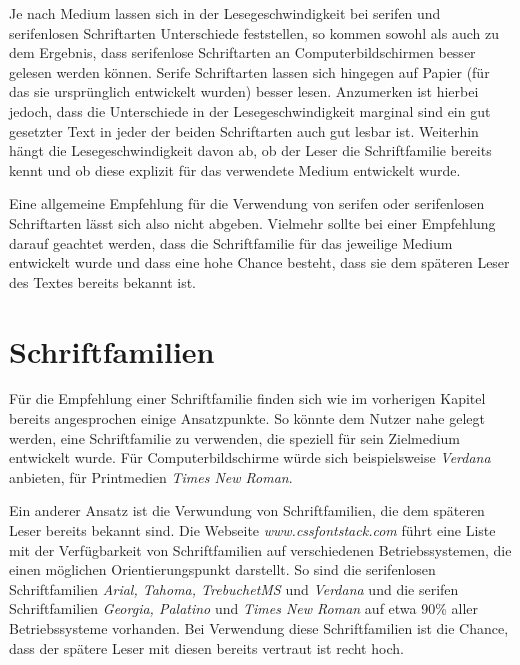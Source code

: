 Je nach Medium lassen sich in der Lesegeschwindigkeit bei serifen und serifenlosen Schriftarten Unterschiede feststellen, so kommen sowohl \cite{josephson2008keeping} als auch \cite{dogusoy2016serif} zu dem Ergebnis, dass serifenlose Schriftarten an Computerbildschirmen besser gelesen werden können. Serife Schriftarten lassen sich hingegen auf Papier (für das sie ursprünglich entwickelt wurden) besser lesen.
Anzumerken ist hierbei jedoch, dass die Unterschiede in der Lesegeschwindigkeit marginal sind ein gut gesetzter Text in jeder der beiden Schriftarten auch gut lesbar ist.
Weiterhin hängt die Lesegeschwindigkeit davon ab, ob der Leser die Schriftfamilie bereits kennt und ob diese explizit für das verwendete Medium entwickelt wurde. \cite{josephson2008keeping}

Eine allgemeine Empfehlung für die Verwendung von serifen oder serifenlosen Schriftarten lässt sich also nicht abgeben. Vielmehr sollte bei einer Empfehlung darauf geachtet werden, dass die Schriftfamilie für das jeweilige Medium entwickelt wurde und dass eine hohe Chance besteht, dass sie dem späteren Leser des Textes bereits bekannt ist.



\section{Schriftfamilien}
Für die Empfehlung einer Schriftfamilie finden sich wie im vorherigen Kapitel bereits angesprochen einige Ansatzpunkte. 
So könnte dem Nutzer nahe gelegt werden, eine Schriftfamilie zu verwenden, die speziell für sein Zielmedium entwickelt wurde. Für Computerbildschirme würde sich beispielsweise \textit{Verdana} anbieten, für Printmedien \textit{Times New Roman}.

Ein anderer Ansatz ist die Verwundung von Schriftfamilien, die dem späteren Leser bereits bekannt sind. Die Webseite \textit{www.cssfontstack.com} \cite{cssfontstack} führt eine Liste mit der Verfügbarkeit von Schriftfamilien auf verschiedenen Betriebssystemen, die einen möglichen Orientierungspunkt darstellt. So sind die serifenlosen Schriftfamilien \textit{Arial, Tahoma, TrebuchetMS} und \textit{Verdana} und die serifen Schriftfamilien \textit{Georgia, Palatino} und \textit{Times New Roman} auf etwa 90\% aller Betriebssysteme vorhanden.
Bei Verwendung diese Schriftfamilien ist die Chance, dass der spätere Leser mit diesen bereits vertraut ist recht hoch.

